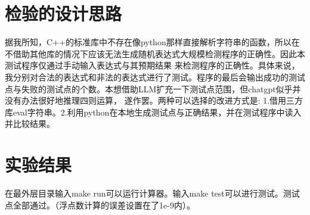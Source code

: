\documentclass[UTF8]{ctexart}
\begin{document}
\section{检验的设计思路}

\par 据我所知，C++的标准库中不存在像python那样直接解析字符串的函数，所以在不借助其他库的情况下应该无法生成随机表达式大规模检测程序的正确性。因此本测试程序仅通过手动输入表达式与其预期结果
来检测程序的正确性。具体来说，我分别对合法的表达式和非法的表达式进行了测试。程序的最后会输出成功的测试点与失败的测试点的个数。本想借助LLM扩充一下测试点范围，但chatgpt似乎并没有办法很好地推理四则运算，
遂作罢。两种可以选择的改进方式是: 1.借用三方库eval字符串。2.利用python在本地生成测试点与正确结果，并在测试程序中读入并比较结果。


\section{实验结果}

\par 在最外层目录输入make run可以运行计算器。输入make test可以进行测试。测试点全部通过。（浮点数计算的误差设置在了1e-9内）。
\end{document}

